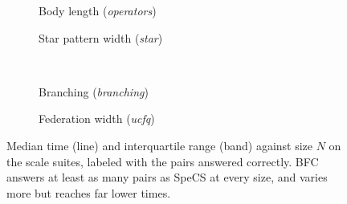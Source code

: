 \begin{figure}[!t]
  \centering
  \begin{subfigure}{0.38\textwidth}
    
    \caption{Body length (\emph{operators})}
  \end{subfigure}
  \hspace{2em}
  \begin{subfigure}{0.38\textwidth}
    
    \caption{Star pattern width (\emph{star})}
  \end{subfigure}
  \\[\medskipamount]
  \begin{subfigure}{0.38\textwidth}
    
    \caption{Branching (\emph{branching})}
  \end{subfigure}
  \hspace{2em}
  \begin{subfigure}{0.38\textwidth}
    
    \caption{Federation width (\emph{ucfq})}
  \end{subfigure}
  \caption{Median time (line) and interquartile range (band) against size $N$ on the scale suites, labeled with the pairs answered correctly.
\acs{BFC} answers at least as many pairs as SpeCS at every size, and varies more but reaches far lower times.}
  \label{fig:growth_bfc_specs}
\end{figure}
